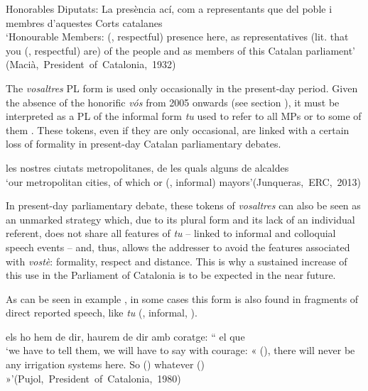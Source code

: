 \documentclass[output=paper]{langscibook}
\begin{document}
\ea\label{ex:nogue:26}
{{Honorables Diputats: La}  {presència ací, com a representants que}  {del poble i membres d’aquestes Corts catalanes}}\\
\glt `Honourable Members:  (, respectful) presence here, as representatives (lit. that you (, respectful) are) of the people and as members of this Catalan parliament'\\
\hfill\hbox{(Macià, President of Catalonia, 1932)}
\z 


The \textit{vosaltres} PL form is used only occasionally in the present-day period. Given the absence of the honorific \textit{vós} from 2005 onwards (see section ), it must be interpreted as a PL of the informal form \textit{tu} used to refer to all MPs or to some of them . These tokens, even if they are only occasional, are linked with a certain loss of formality in present-day Catalan parliamentary debates.



\ea\label{ex:nogue:27}
{{{les nostres ciutats metropolitanes, de les quals alguns de}   {alcaldes}}}\\
\glt `our metropolitan cities, of which     or   (,  informal) mayors'\hfill\hbox{(Junqueras, ERC, 2013)}\\
\z 


In present-day parliamentary debate, these tokens of \textit{vosaltres} can also be seen as an unmarked strategy which, due to its plural form and its lack of an individual referent, does not share all features of \textit{tu} – linked to informal and colloquial speech events – and, thus, allows the addresser to avoid the features associated with \textit{vostè}: formality, respect and distance. This is why a sustained increase of this use in the Parliament of Catalonia is to be expected in the near future.



As can be seen in example , in some cases this form is also found in fragments of direct reported speech, like \textit{tu} (, informal, ).


\ea\label{ex:nogue:28}
{{els ho hem de dir, haurem de dir amb coratge: “}  {el que} }\\
\glt `we have to tell them, we will have to say with courage: « (), there will never be any irrigation systems here. So  () whatever  () »'\hfill\hbox{(Pujol, President of Catalonia, 1980)}\\
\z 
\end{document}

